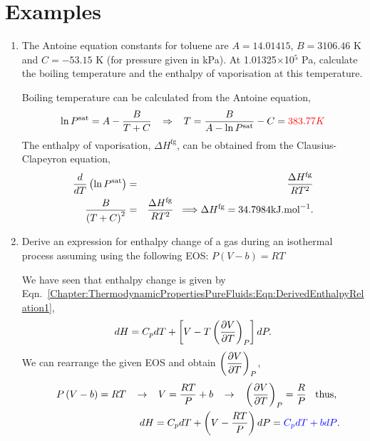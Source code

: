 \section{Examples}
       \begin{enumerate}

\item\label{Mod03Ex03} The Antoine equation constants for toluene are $A=14.01415$, $B=3106.46$ K and $C=-53.15$ K (for pressure given in kPa). At 1.01325$\times$10$^{5}$ Pa, calculate the boiling temperature and the enthalpy of vaporisation at this temperature.

     Boiling temperature can be calculated from the Antoine equation,
       \begin{displaymath}
          \ln{P^{\text{sat}}} = A - \frc{B}{T+C} \;\;\;\Rightarrow \;\;\; T = \frc{B}{A-\ln{P^{\text{sat}}}} - C = \red{383.77 K}
       \end{displaymath}
The enthalpy of vaporisation, $\Delta H^{\text{fg}}$, can be obtained from the Clausius-Clapeyron equation,
         \begin{eqnarray}
            \frc{d}{dT} \left(\ln{P^{\text{sat}}}\right) &=& \frc{\Delta H^{\text{fg}}}{RT^{2}} \nonumber \\
             \frc{B}{\left(T+C\right)^{2}} &=&  \frc{\Delta H^{\text{fg}}}{RT^{2}} \;\;\Longrightarrow \Delta H^{\text{fg}} = 34.7984 \text{kJ.mol}^{-1}. \nonumber
         \end{eqnarray}
 
\clearpage

\item\label{Mod03Ex04} Derive an expression for enthalpy change of a gas during an isothermal process assuming using the following EOS: $P\left(V-b\right)=RT$

     We have seen that enthalpy change is given by Eqn.~\ref{Chapter:ThermodynamicPropertiesPureFluids:Eqn:DerivedEnthalpyRelation1},
    \begin{displaymath}
       dH = C_{p}dT + \left[V - T\Partial[V]{T}{P}\right]dP.
    \end{displaymath}
    We can rearrange the given EOS and obtain $\Partial[V]{T}{P}$,
    \begin{eqnarray}
       && P\left(V-b\right)=RT \;\;\;\rightarrow\;\;\; V = \frc{RT}{P} + b \;\;\;\rightarrow\;\;\; \Partial[V]{T}{P} = \frc{R}{P}\;\;\text{ thus, } \nonumber \\
       && dH = C_{p}dT + \left(V - \frc{RT}{P}\right)dP = \blue{C_{p}dT + bdP}. \nonumber 
    \end{eqnarray}
    

\end{enumerate}
